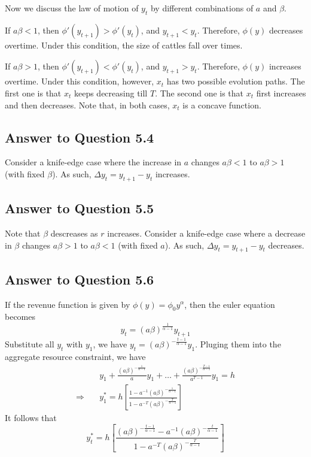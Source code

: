 \documentclass[11pt]{article}
\theoremstyle{definition}
\theoremstyle{boldtitle} %
\numberwithin{equation}{section}
\numberwithin{figure}{section}
\numberwithin{table}{section}
\begin{document}
Now we discuss the law of motion of $y_t$ by different combinations of $a$ and $\beta$.

If $a \beta < 1$, then $\phi'(y_{t+1}) > \phi'(y_t)$, and $y_{t+1} < y_t$. Therefore, $\phi(y)$ decreases overtime.
Under this condition, the size of cattles fall over times.

If $a \beta > 1$, then $\phi'(y_{t+1}) < \phi'(y_t)$, and $y_{t+1} > y_t$. Therefore, $\phi(y)$ increases overtime.
Under this condition, however, $x_{t}$ has two possible evolution paths.
The first one is that $x_{t}$ keeps decreasing till $T$.
The second one is that $x_{t}$ first increases and then decreases.
Note that, in both cases, $x_{t}$ is a concave function.


\subsection*{Answer to Question 5.4}
Consider a knife-edge case where the increase in $a$ changes $a \beta < 1$ to $a \beta > 1$ (with fixed $\beta$).
As such, $\Delta y_t = y_{t+1} - y_{t}$ increases.


\subsection*{Answer to Question 5.5}
Note that $\beta$ descreases as $r$ increases.
Consider a knife-edge case where a decrease in $\beta$ 
changes $a \beta > 1$ to $a \beta < 1$ (with fixed $a$).
As such, $\Delta y_t = y_{t+1} - y_{t}$ decreases.


\subsection*{Answer to Question 5.6}
If the revenue function is given by $\phi(y) = \phi_0 y^\alpha$, then the euler equation becomes 
\[
y_t = (a \beta)^{\frac{1}{\alpha - 1}} y_{t+1}
\]
Substitute all $y_{t}$ with $y_1$, we have $y_t = (a \beta)^{-\frac{t-1}{\alpha - 1}} y_1$.
Pluging them into the aggregate resource constraint, we have 
\begin{align*}
    & y_1 + \frac{(a \beta)^{-\frac{1}{\alpha -1}}}{a}y_1 + \ldots + \frac{(a \beta)^{-\frac{T-1}{\alpha -1}}}{a^{T-1}}y_1 = h \\
\Rightarrow \quad & y_1^* = h \left[ \frac{1 - a^{-1}(a \beta )^{-\frac{1}{\alpha - 1}}
    }{
        1 - a^{-T} (a \beta)^{-\frac{T}{\alpha - 1}}
    }\right]
\end{align*}
It follows that 
\[
y_t^* =  h \left[ \frac{(a \beta)^{-\frac{t-1}{\alpha - 1}} - a^{-1}(a \beta )^{-\frac{t}{\alpha - 1}} 
    }{
        1 - a^{-T} (a \beta)^{-\frac{T}{\alpha - 1}}
    }\right]
\]
\end{document}
